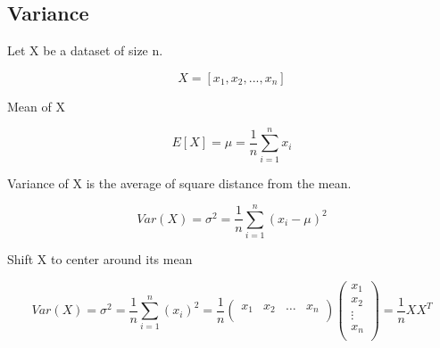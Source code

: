 \documentclass{article}
\begin{document}
\subsection{Variance}

Let X be a dataset of size n.

$$X = [x_1, x_2, ..., x_n]$$

Mean of X

$$E[X] = \mu = \frac{1}{n}\sum_{i=1}^{n}x_i$$

Variance of X is the average of square distance from the mean.

$$Var(X) = \sigma^2 = \frac{1}{n}\sum_{i=1}^{n} (x_i - \mu)^2$$

Shift X to center around its mean

$$Var(X)
= \sigma^2
= \frac{1}{n}\sum_{i=1}^{n}(x_i)^2
= \frac{1}{n}
\begin{pmatrix}
  x_1 & x_2 &  \dots & x_n \\
\end{pmatrix}
\begin{pmatrix}
  x_1 \\ x_2 \\ \vdots \\ x_n \\
\end{pmatrix}
= \frac{1}{n}XX^T
$$
\end{document}
